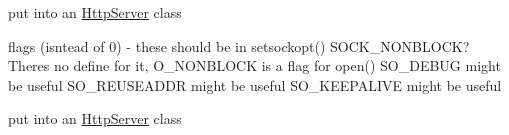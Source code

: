 
\begin{DoxyRefList}
\item[Member \mbox{\hyperlink{socket_8cpp_ae12384871780d23a8e31371d53372090}{read\+Request}} (\mbox{\hyperlink{classTcpSocket}{Tcp\+Socket}} socket, int port)]\label{todo__todo000004}%
%
put into an \mbox{\hyperlink{classHttpServer}{Http\+Server}} class  
\item[Member \mbox{\hyperlink{classTcpSocket_a132aa72af141d611f8bad96ba585a79f}{Tcp\+Socket\+::Tcp\+Socket}} ()]\label{todo__todo000003}%
%
flags (isntead of 0) -\/ these should be in setsockopt() SOCK\+\_\+\+NONBLOCK? There\textquotesingle{}s no define for it, O\+\_\+\+NONBLOCK is a flag for open() SO\+\_\+\+DEBUG might be useful SO\+\_\+\+REUSEADDR might be useful SO\+\_\+\+KEEPALIVE might be useful  
\item[Member \mbox{\hyperlink{socket_8cpp_a1a8714346b2d11ab73e94d6e551aab18}{write\+Response}} (int port, \mbox{\hyperlink{classTcpSocket}{Tcp\+Socket}} socket, \mbox{\hyperlink{structResponse}{Response}} response)]\label{todo__todo000005}%
%
put into an \mbox{\hyperlink{classHttpServer}{Http\+Server}} class 
\end{DoxyRefList}